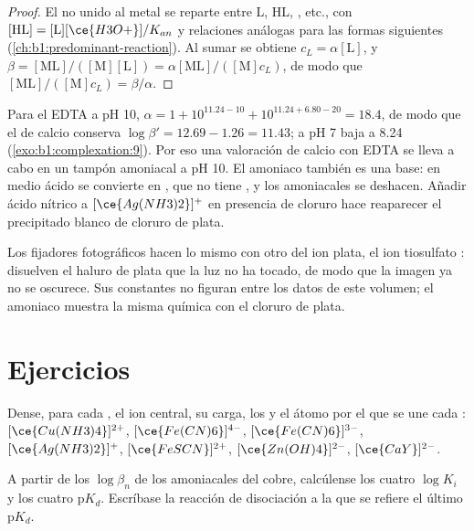\begin{proof}
El  no unido al metal se reparte entre L, HL, , etc., con
$[\mathrm{HL}] = [\mathrm{L}][\ce{H3O+}]/K_{an}$ y relaciones análogas
para las formas siguientes (\cref{ch:b1:predominant-reaction}). Al sumar
se obtiene $c_L = \alpha[\mathrm{L}]$,
y $\beta = [\mathrm{ML}]/([\mathrm{M}][\mathrm{L}]) =
\alpha[\mathrm{ML}]/([\mathrm{M}]c_L)$, de modo que $[\mathrm{ML}]/([\mathrm{M}]c_L)
= \beta/\alpha$.
\end{proof}

Para el EDTA a pH 10, $\alpha = 1 + 10^{11.24 - 10} + 10^{11.24 + 6.80 - 20}
= 18.4$, de modo que el  de calcio conserva
$\log\beta' = 12.69 - 1.26 = 11.43$; a pH 7 baja a 8.24
(\cref{exo:b1:complexation:9}). Por eso una valoración de calcio con EDTA
se lleva a cabo en un tampón amoniacal a pH 10. El amoniaco también es
una base: en medio ácido se convierte en , que no tiene , y los  amoniacales se deshacen. Añadir ácido nítrico
a $[\ce{Ag(NH3)2}]^{+}$ en presencia de cloruro hace reaparecer el
precipitado blanco de cloruro de plata.

Los fijadores fotográficos hacen lo mismo con otro  del ion plata,
el ion tiosulfato : disuelven el haluro de plata que la luz no
ha tocado, de modo que la imagen ya no se oscurece. Sus constantes no
figuran entre los datos de este volumen; el amoniaco muestra la misma
química con el cloruro de plata.

\section{Ejercicios}

\begin{exercise}[$\star$]\label{exo:b1:complexation:1}
Dense, para cada , el ion central, su carga, los  y el
átomo por el que se une cada : $[\ce{Cu(NH3)4}]^{2+}$,
$[\ce{Fe(CN)6}]^{4-}$, $[\ce{Fe(CN)6}]^{3-}$, $[\ce{Ag(NH3)2}]^{+}$,
$[\ce{FeSCN}]^{2+}$, $[\ce{Zn(OH)4}]^{2-}$, $[\ce{CaY}]^{2-}$.
\end{exercise}

\begin{exercise}[$\star$]\label{exo:b1:complexation:2}
A partir de los $\log\beta_n$ de los  amoniacales del cobre,
calcúlense los cuatro $\log K_i$ y los cuatro $\mathrm{p}K_d$. Escríbase la
reacción de disociación a la que se refiere el último $\mathrm{p}K_d$.
\end{exercise}

